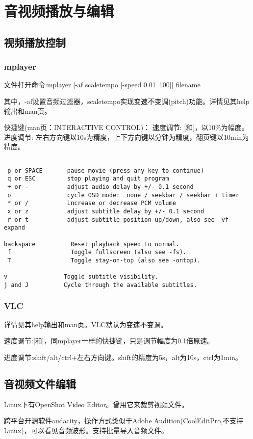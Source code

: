 \section{音视频播放与编辑}

\subsection{视频播放控制}
\subsubsection{mplayer}
文件打开命令:mplayer [-af scaletempo [-speed 0.01~100]] filename

其中，-af设置音频过滤器，scaletempo实现变速不变调(pitch)功能。详情见其help输出和man页。

快捷键(man页：INTERACTIVE CONTROL)：
速度调节: 	[和]，以10\%为幅度。
进度调节:	左右方向键以10s为精度，上下方向键以分钟为精度，翻页键以10min为精度。

\begin{verbatim}

 p or SPACE       pause movie (press any key to continue)
 q or ESC         stop playing and quit program
 + or -           adjust audio delay by +/- 0.1 second
 o                cycle OSD mode:  none / seekbar / seekbar + timer
 * or /           increase or decrease PCM volume
 x or z           adjust subtitle delay by +/- 0.1 second
 r or t           adjust subtitle position up/down, also see -vf expand

backspace          Reset playback speed to normal.
 f                 Toggle fullscreen (also see -fs).
 T                 Toggle stay-on-top (also see -ontop).

v                Toggle subtitle visibility.
j and J          Cycle through the available subtitles.
\end{verbatim}

\subsubsection{VLC}
详情见其help输出和man页。VLC默认为变速不变调。

速度调节:[和]，同mplayer一样的快捷键，只是调节幅度为0.1倍原速。

进度调节:shift/alt/ctrl+左右方向键。shift的精度为5s，alt为10s，ctrl为1min。


\subsection{音视频文件编辑}
Linux下有OpenShot Video Editor。曾用它来裁剪视频文件。

跨平台开源软件audacity，操作方式类似于Adobe Audition(CoolEditPro,不支持Linux)，可以看见音频波形。支持批量导入音频文件。

